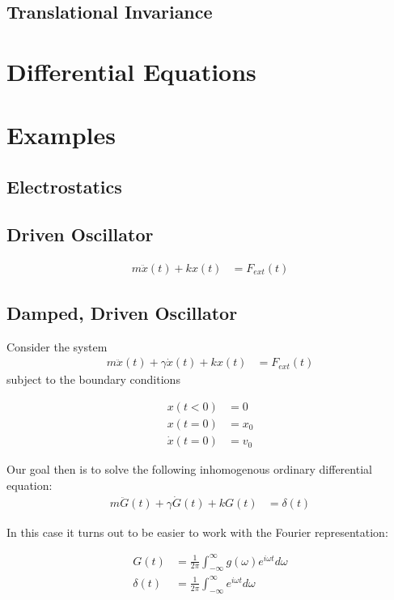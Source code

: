 \documentclass[11pt]{article}
\theoremstyle{plain}
\theoremstyle{definition}
\begin{document}
\subsection{Translational Invariance}

\section{Differential Equations}



\section{Examples}
\subsection{Electrostatics}
\subsection{Driven Oscillator}
\begin{align}
    m \ddot x(t) + kx(t) &= F_{ext}(t)
\end{align}


\subsection{Damped, Driven  Oscillator}

Consider the system
\begin{align}
    m \ddot x(t) + \gamma \dot x(t) + kx(t) &= F_{ext}(t) \label{eq:DDHO}
\end{align}
subject to the boundary conditions

\begin{align}
    x(t < 0) &= 0 \\
    x(t=0) &= x_0 \label{eq:X0}\\
    \dot x(t = 0) &= v_0 \label{eq:V0}
\end{align}

Our goal then is to solve the following inhomogenous ordinary differential equation:
\begin{align}
    m \ddot G(t) + \gamma \dot G(t) + kG(t) &= \delta(t) \label{eq:DDHOG}
\end{align}


In this case it turns out to be easier to work with the Fourier representation:

\begin{align}
    G(t) &= \frac{1}{2\pi} \int_{-\infty}^{\infty} g(\omega) e^{i\omega t} d\omega \label{eq:DDHOGF} \\
    \delta(t) &= \frac{1}{2\pi} \int_{-\infty}^{\infty} e^{i\omega t} d\omega \label{eq:DF}
\end{align}
\end{document}
